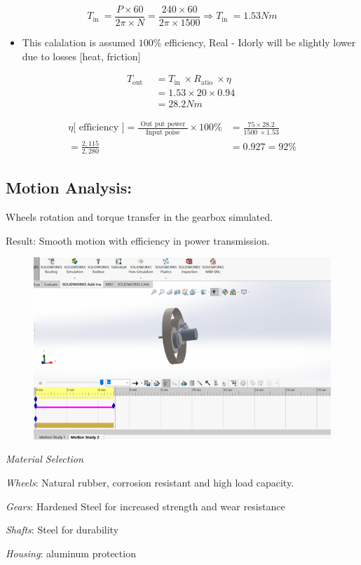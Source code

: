 \documentclass[../../main]{subfiles}
\begin{document}
\[T_{\text{in~}} = \frac{P \times 60}{2\pi \times N} = \frac{240 \times 60}{2\pi \times 1500} \Rightarrow T_{\text{in~}} = 1.53Nm\]

\begin{itemize}
\item
  This calalation is assumed \(100\%\) efficiency, Real - Idorly will be
  slightly lower due to losses {[}heat, friction{]}
\end{itemize}

\[\begin{aligned}
T_{\text{out~}}  \  &= T_{\text{in~}} \times R_{\text{atio~}} \times \eta\text{~~} \\
\  &= 1.53 \times 20 \times 0.94 \\
\  &= 28.2Nm
\end{aligned}\]

\[\begin{aligned}
\eta\lbrack\text{~efficiency~}\rbrack = \frac{\text{~Out put power~}}{\text{~Input poise~}} \times 100\% &= \frac{75 \times 28.2}{1500\  \times 1.53} \\
= \frac{2,115}{2,280} &= 0.927 = 92\%
\end{aligned}\]


\subsection{Motion Analysis:}

Wheels\textquotesingle{} rotation and torque transfer in the gearbox
simulated.

Result: Smooth motion with efficiency in power transmission.
\begin{figure}[h]
  \centering
\includegraphics[]{sublatex/Opryrmi/media/image7.png}
\caption{}
\end{figure}

\emph{Material Selection}

\emph{Wheels}: Natural rubber, corrosion resistant and high load capacity.

\emph{Gears}: Hardened Steel for increased strength and wear resistance

\emph{Shafts}: Steel for durability

\emph{Housing}: aluminum protection
\end{document}
